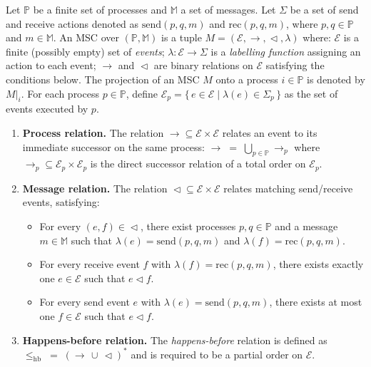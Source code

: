 \begin{definition}\label{def:msc}
Let $\mathbb{P}$ be a finite set of processes and $\mathbb{M}$ a set of messages.
Let $\Sigma$ be a set of send and receive actions denoted as $\mathrm{send}(p,q,m)$
and $\mathrm{rec}(p,q,m)$, where $p,q \in \mathbb{P}$ and $m\in \mathbb{M}$.
An MSC over $(\mathbb{P}, \mathbb{M})$ is a tuple
$M = (\mathcal{E}, \rightarrow, \vartriangleleft, \lambda)$ where:
$\mathcal{E}$ is a finite (possibly empty) set of \emph{events};
$\lambda : \mathcal{E} \to \Sigma$ is a \emph{labelling function} assigning an action to each event;
$\rightarrow$ and $\vartriangleleft$ are binary relations on $\mathcal{E}$ satisfying the conditions below.
The projection of an MSC $M$ onto a process $i \in \mathbb{P}$ is denoted by $M|_i$.
For each process $p \in \mathbb{P}$, define
$\mathcal{E}_p = \{\, e \in \mathcal{E} \mid \lambda(e) \in \Sigma_p \,\}$
as the set of events executed by $p$.
\begin{enumerate}
    \item \textbf{Process relation.}  
    The relation $\rightarrow \subseteq \mathcal{E} \times \mathcal{E}$ relates an event to its immediate successor on the same process:
    $\rightarrow \;=\; \bigcup_{p \in \mathbb{P}} \rightarrow_p$
    where $\rightarrow_p \subseteq \mathcal{E}_p \times \mathcal{E}_p$ is the direct successor relation of a total order on $\mathcal{E}_p$.

    \item \textbf{Message relation.}  
    The relation $\vartriangleleft \subseteq \mathcal{E} \times \mathcal{E}$ relates matching send/receive events, satisfying:
    \begin{itemize}
        \item For every $(e,f) \in \vartriangleleft$, there exist processes $p,q \in \mathbb{P}$ and a message $m \in \mathbb{M}$ such that  
        $\lambda(e) = \mathrm{send}(p,q,m)$ and $\lambda(f) = \mathrm{rec}(p,q,m)$.
        \item For every receive event $f$ with $\lambda(f) = \mathrm{rec}(p,q,m)$, there exists exactly one $e \in \mathcal{E}$ such that $e \vartriangleleft f$.
        \item For every send event $e$ with $\lambda(e) = \mathrm{send}(p,q,m)$, there exists at most one $f \in \mathcal{E}$ such that $e \vartriangleleft f$.
    \end{itemize}

    \item \textbf{Happens-before relation.}  
    The \emph{happens-before} relation is defined as
    $\le_{\mathrm{hb}} \;=\; (\rightarrow \,\cup\, \vartriangleleft)^{*}$
    and is required to be a partial order on $\mathcal{E}$.
\end{enumerate}
\end{definition}

